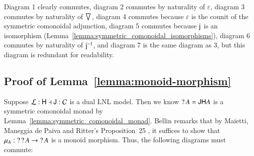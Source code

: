 Diagram 1 clearly commutes, diagram 2 commutes by naturality of
$\varepsilon$, diagram 3 commutes by naturality of $\bigtriangledown_{}$,
diagram 4 commutes because $\varepsilon$ is the counit of the
symmetric comonoidal adjunction, diagram 5 commutes because $\mathsf{j}_{}$
is an isomorphism
(Lemma~\ref{lemma:symmetric_comonoidal_isomorphisms}), diagram 6
commutes by naturality of $\mathsf{j}^{-1}_{}$, and diagram 7 is the same
diagram as 3, but this diagram is redundant for readability.

\subsection{Proof of Lemma~\ref{lemma:monoid-morphism}}
\label{sec:proof_of_lemma:monoid-morphism}
Suppose $\mathcal{L} : \mathsf{H} \dashv \mathsf{J} : \mathcal{C}$ is a dual LNL
model.  Then we know $\mathop{?} A = \mathsf{J}\mathsf{H} A$ is a symmetric comonoidal
monad by Lemma~\ref{lemma:symmetric_comonoidal_monad}.  Bellin
\cite{Bellin:2012} remarks that by Maietti, Maneggia de Paiva and
Ritter's Proposition~25 \cite{Maietti2005}, it suffices to show that
$\mu_A : \mathop{?}\mathop{?} A \rightarrow \mathop{?} A$ is a monoid morphism.  Thus, the
following diagrams must commute:
